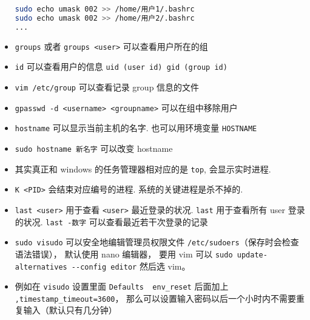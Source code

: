 \begin{itemize}
\begin{lstlisting}[language=bash]
sudo echo umask 002 >> /home/用户1/.bashrc
sudo echo umask 002 >> /home/用户2/.bashrc
...
\end{lstlisting}
\item \verb`groups` 或者 \verb`groups <user>` 可以查看用户所在的组
\item \verb`id` 可以查看用户的信息 \verb`uid (user id) gid (group id)`
\item \verb`vim /etc/group` 可以查看记录 group 信息的文件
\item \verb`gpasswd -d <username> <groupname>` 可以在组中移除用户
\item \verb`hostname` 可以显示当前主机的名字. 也可以用环境变量 \verb|HOSTNAME|
\item \verb|sudo hostname 新名字| 可以改变 hostname
\item 其实真正和 windows 的任务管理器相对应的是 \verb`top`, 会显示实时进程. 
\item \verb`K <PID>` 会结束对应编号的进程. 系统的关键进程是杀不掉的.
\item \verb`last <user>` 用于查看 \verb`<user>` 最近登录的状况. \verb`last` 用于查看所有 user 登录的状况. \verb`last -数字` 可以查看最近若干次登录的记录
\item \verb|sudo visudo| 可以安全地编辑管理员权限文件 \verb|/etc/sudoers|（保存时会检查语法错误）， 默认使用 nano 编辑器， 要用 vim
 可以 \verb|sudo update-alternatives --config editor| 然后选 vim。
\item 例如在 \verb|visudo| 设置里面 \verb|Defaults  env_reset| 后面加上 \verb|,timestamp_timeout=3600|， 那么可以设置输入密码以后一个小时内不需要重复输入（默认只有几分钟）
\end{itemize}


